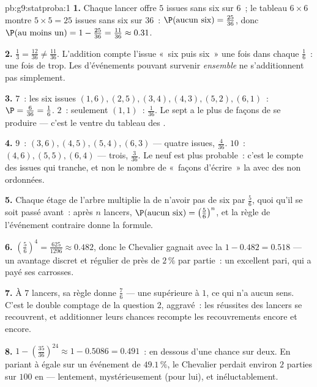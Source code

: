 \begin{solution}{pb:g9:statproba:1}
\textbf{1.} Chaque lancer offre $5$ issues sans six sur $6$~; le
tableau $6 \times 6$ montre $5 \times 5 = 25$ issues sans six sur
$36$~: $\P(\text{aucun six}) = \frac{25}{36}$, donc
$\P(\text{au moins un}) = 1 - \frac{25}{36} = \frac{11}{36}
\approx 0.31$.

\textbf{2.} $\frac13 = \frac{12}{36} \neq \frac{11}{36}$.
L'addition compte l'issue «~six puis six~» une fois dans chaque
$\frac16$~: une fois de trop. Les  d'événements pouvant
survenir \emph{ensemble} ne s'additionnent pas simplement.

\textbf{3.}  $7$~: les six issues $(1,6), (2,5), (3,4),
(4,3), (5,2), (6,1)$~: $\P = \frac{6}{36} = \frac16$.  $2$~:
seulement $(1,1)$~: $\frac{1}{36}$. Le sept a le plus de façons de
se produire --- c'est le ventre du tableau des .

\textbf{4.}  $9$~: $(3,6), (4,5), (5,4), (6,3)$ --- quatre
issues, $\frac{4}{36}$.  $10$~: $(4,6), (5,5), (6,4)$ ---
trois, $\frac{3}{36}$. Le neuf est plus probable~: c'est le compte
des issues qui tranche, et non le nombre de «~façons d'écrire~» la
 avec des  non ordonnées.

\textbf{5.} Chaque étage de l'arbre multiplie la  de
n'avoir pas de six par $\frac56$, quoi qu'il se soit passé avant~:
après $n$ lancers,
$\P(\text{aucun six}) = \left(\frac56\right)^n$, et la règle de
l'événement contraire donne la formule.

\textbf{6.} $\left(\frac56\right)^4 = \frac{625}{1296} \approx
0.482$, donc le Chevalier gagnait avec la 
$1 - 0.482 = 0.518$ --- un avantage discret et régulier de près de
$2\,\%$ par partie~: un excellent pari, qui a payé ses carrosses.

\textbf{7.} À $7$ lancers, sa règle donne $\frac76$ --- une
 supérieure à $1$, ce qui n'a aucun sens. C'est le double
comptage de la question 2, aggravé~: les réussites des lancers se
recouvrent, et additionner leurs chances recompte les recouvrements
encore et encore.

\textbf{8.} $1 - \left(\frac{35}{36}\right)^{24} \approx
1 - 0.5086 = 0.491$~: en dessous d'une chance sur deux. En pariant à
 égale sur un événement de  $49.1\,\%$, le Chevalier
perdait environ $2$ parties sur $100$ en  --- lentement,
mystérieusement (pour lui), et inéluctablement.


\end{solution}
